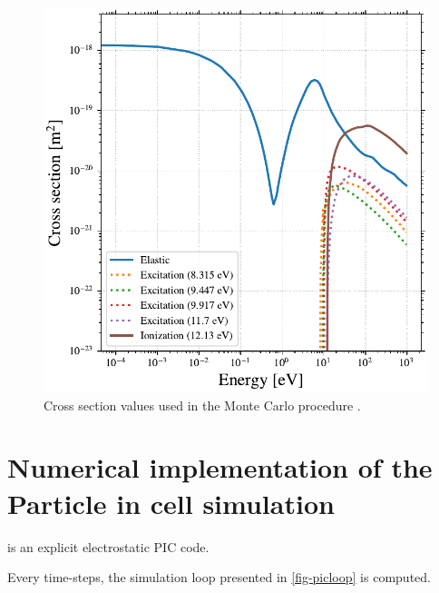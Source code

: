 \begin{figure}[hbtp]
  \centering
  \includegraphics[width=\defaultwidth]{figure/xenon_cross_section.pdf}
  \caption{Cross section values used in the Monte Carlo procedure \cite{Lxcat_Xe,Lxcat_Xe2}.}
  \label{fig-xexsection}
\end{figure}


\section{Numerical implementation of the Particle in cell simulation}

\LPPic is an explicit electrostatic \ac{PIC} code.

Every time-steps, the simulation loop presented in \cref{fig-picloop} is computed.

